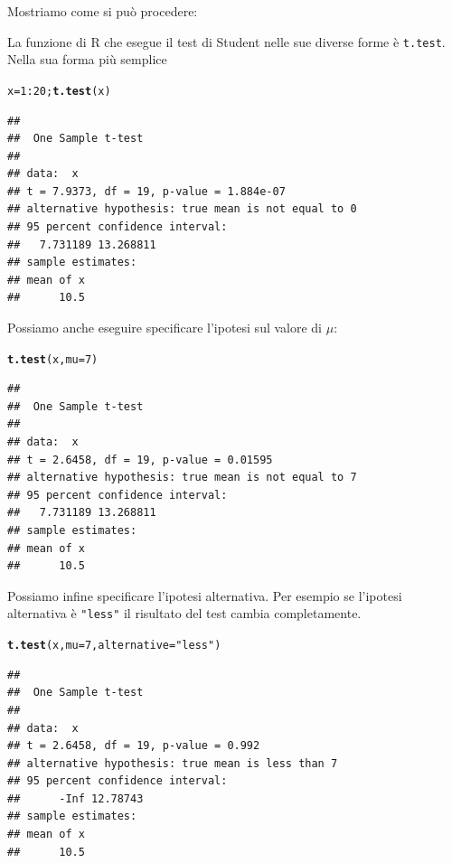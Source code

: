 \documentclass[onecolumn,12pt]{book}\usepackage[]{graphicx}\usepackage[]{color}
\makeatletter
\newcommand{\hlnum}[1]{\textcolor[rgb]{0.686,0.059,0.569}{#1}}%
\newcommand{\hlstr}[1]{\textcolor[rgb]{0.192,0.494,0.8}{#1}}%
\newcommand{\hlopt}[1]{\textcolor[rgb]{0,0,0}{#1}}%
\newcommand{\hlstd}[1]{\textcolor[rgb]{0.345,0.345,0.345}{#1}}%
\newcommand{\hlkwb}[1]{\textcolor[rgb]{0.69,0.353,0.396}{#1}}%
\newcommand{\hlkwc}[1]{\textcolor[rgb]{0.333,0.667,0.333}{#1}}%
\newcommand{\hlkwd}[1]{\textcolor[rgb]{0.737,0.353,0.396}{\textbf{#1}}}%
\newenvironment{kframe}{%
 \def\at@end@of@kframe{}%
 \ifinner\ifhmode%
  \def\at@end@of@kframe{\end{minipage}}%
  \begin{minipage}{\columnwidth}%
 \fi\fi%
 \def\FrameCommand##1{\hskip\@totalleftmargin \hskip-\fboxsep
 \colorbox{shadecolor}{##1}\hskip-\fboxsep
     \hskip-\linewidth \hskip-\@totalleftmargin \hskip\columnwidth}%
 \MakeFramed {\advance\hsize-\width
   \@totalleftmargin\z@ \linewidth\hsize
   \@setminipage}}%
 {\par\unskip\endMakeFramed%
 \at@end@of@kframe}
\newenvironment{knitrout}{}{} %
\newcommand{\virgolette}{\selectlanguage{english}\texttt{"}\selectlanguage{italian}}
\makeatother
\begin{document}
Mostriamo come si può procedere:  
 
La funzione di
\textsf{R} che esegue il test di Student nelle sue diverse forme \`e  \texttt{t.test}.   Nella sua forma pi\`u semplice

\begin{knitrout}
\color{fgcolor}\begin{kframe}
\begin{alltt}
\hlstd{x}\hlkwb{=}\hlnum{1}\hlopt{:}\hlnum{20}\hlstd{;}  \hlkwd{t.test}\hlstd{(x)}
\end{alltt}
\begin{verbatim}
## 
## 	One Sample t-test
## 
## data:  x
## t = 7.9373, df = 19, p-value = 1.884e-07
## alternative hypothesis: true mean is not equal to 0
## 95 percent confidence interval:
##   7.731189 13.268811
## sample estimates:
## mean of x 
##      10.5
\end{verbatim}
\end{kframe}
\end{knitrout}
Possiamo anche eseguire specificare l'ipotesi sul valore di $\mu$:
\begin{knitrout}
\color{fgcolor}\begin{kframe}
\begin{alltt}
\hlkwd{t.test}\hlstd{(x,}\hlkwc{mu}\hlstd{=}\hlnum{7}\hlstd{)}
\end{alltt}
\begin{verbatim}
## 
## 	One Sample t-test
## 
## data:  x
## t = 2.6458, df = 19, p-value = 0.01595
## alternative hypothesis: true mean is not equal to 7
## 95 percent confidence interval:
##   7.731189 13.268811
## sample estimates:
## mean of x 
##      10.5
\end{verbatim}
\end{kframe}
\end{knitrout}
Possiamo infine specificare l'ipotesi alternativa. Per esempio se l'ipotesi alternativa \`e
\texttt{\virgolette less\virgolette}  il risultato del test cambia completamente.
\begin{knitrout}
\color{fgcolor}\begin{kframe}
\begin{alltt}
\hlkwd{t.test}\hlstd{(x,}\hlkwc{mu}\hlstd{=}\hlnum{7}\hlstd{,} \hlkwc{alternative}\hlstd{=}\hlstr{"less"}\hlstd{)}
\end{alltt}
\begin{verbatim}
## 
## 	One Sample t-test
## 
## data:  x
## t = 2.6458, df = 19, p-value = 0.992
## alternative hypothesis: true mean is less than 7
## 95 percent confidence interval:
##      -Inf 12.78743
## sample estimates:
## mean of x 
##      10.5
\end{verbatim}
\end{kframe}
\end{knitrout}
\end{document}
